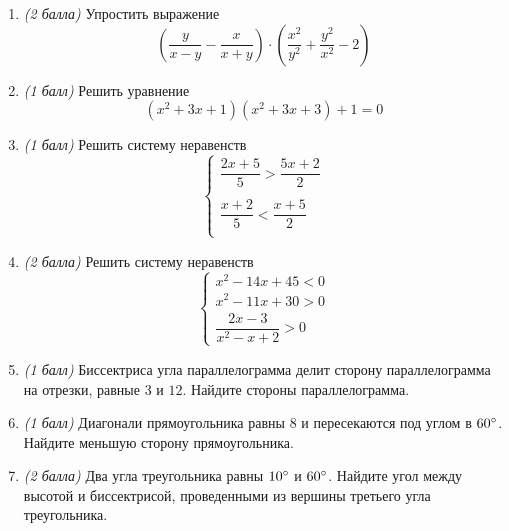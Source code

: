 \documentclass[12pt, a4paper]{article}
\begin{document}
	
	\begin{enumerate}
		\item \textit{(2 балла)} Упростить выражение $$\left(\dfrac{y}{x-y}-\dfrac{x}{x+y}\right)\cdot\left(\dfrac{x^2}{y^2}+\dfrac{y^2}{x^2}-2\right)$$
		\item \textit{(1 балл)} Решить уравнение $$(x^2+3x+1)(x^2+3x+3)+1=0$$
		\item \textit{(1 балл)} Решить систему неравенств 
		$$
		\left\{
		\begin{array}{l}
			\dfrac{2x+5}{5}>\dfrac{5x+2}{2}\\\\
			\dfrac{x+2}{5}<\dfrac{x+5}{2}\\
		\end{array}
		\right.
		$$
		\item \textit{(2 балла)} Решить систему неравенств 
		$$
		\left\{
		\begin{array}{l}
			x^2-14x+45 < 0\\
			x^2-11x+30 > 0\\
			\dfrac{2x-3}{x^2-x+2}>0
		\end{array}
		\right.
		$$
		\item \textit{(1 балл)} Биссектриса угла параллелограмма делит сторону параллелограмма на отрезки, равные $3$ и $12$. Найдите стороны параллелограмма.
		\item \textit{(1 балл)} Диагонали прямоугольника равны 8 и пересекаются под углом в $60\degree$. Найдите меньшую сторону прямоугольника.
		\item \textit{(2 балла)} Два угла треугольника равны $10\degree$ и $60\degree$. Найдите угол между высотой и биссектрисой, проведенными из вершины третьего угла треугольника.
	\end{enumerate}
\end{document}
